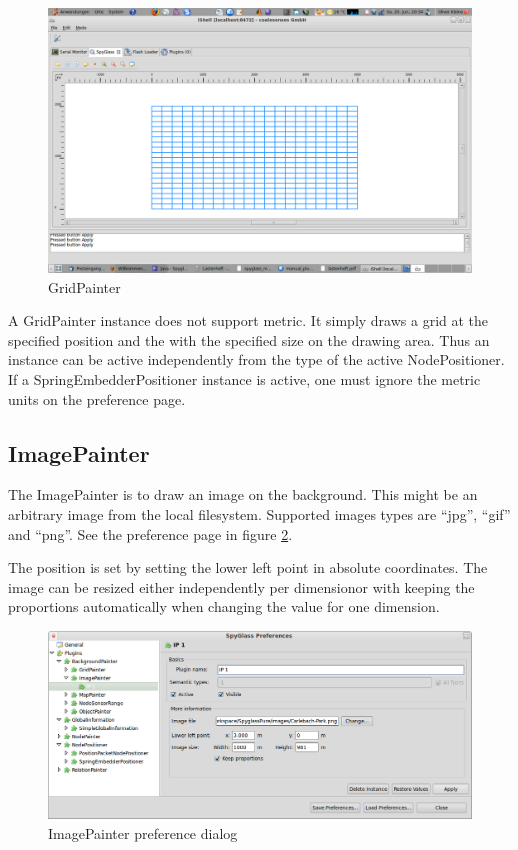 \begin{figure}[htb]
  \begin{center}
    \includegraphics[width=13.2cm]{./pics/gridpainter}
    \caption{GridPainter}
    \label{pic:gp}
  \end{center}
\end{figure}

A GridPainter instance does not support metric. It simply draws a grid at the specified position and the with
the specified size on the drawing area. Thus an instance can be active independently from the type of the
active NodePositioner. If a SpringEmbedderPositioner instance is active, one must ignore the metric units
on the preference page. 

\subsection{ImagePainter}

The ImagePainter is to draw an image on the background. This might be an arbitrary image from the local filesystem.
Supported images types are ``jpg'', ``gif'' and ``png''. See the preference page in figure \ref{pic:ip_preferences}.

The position is set by setting the lower left point in absolute coordinates. The image can be resized either 
independently per dimensionor with keeping the proportions automatically when changing the value for one dimension.

\begin{figure}[htb]
  \begin{center}
    \includegraphics[width=13.2cm]{./pics/imagepainter_prefpage}
    \caption{ImagePainter preference dialog}
    \label{pic:ip_preferences}
  \end{center}
\end{figure}

